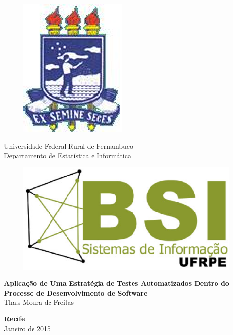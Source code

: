 \begin{figure}[h]
\leavevmode
\begin{minipage}{\textwidth}
\includegraphics[scale=0.7]
{prefacios/capa/logo-ufrpe.eps}
\end{minipage}
\end{figure}
\vspace{-3.5cm}
{\bf
\begin{center}
{\Large
\hspace*{0cm}Universidade Federal Rural de Pernambuco \\
\hspace*{0cm}Departamento de Estatística e Informática}\\
\end{center}
}
\noindent
\begin{figure}[h]
\centering
\includegraphics[scale=0.5]{prefacios/capa/logo-bsi-presencial-v3-amp.eps}
\end{figure}


\vspace{2.5cm}
\noindent
\begin{center}
{\Large \bf Aplicação de Uma Estratégia de Testes Automatizados Dentro do Processo de Desenvolvimento de Software} \\[5cm]
{\Large Thais Moura de Freitas}\\[6mm]
\end{center}


\vspace{1.5cm}
\begin{center}
{\large {\bf Recife}\\[6mm]
Janeiro de 2015}
\end{center}
\newpage
